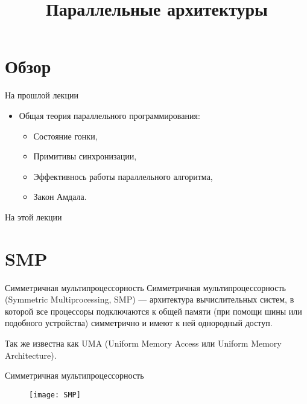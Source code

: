 

\title{Параллельные архитектуры}



\begin{frame}
\titlepage
\end{frame}

\section*{Обзор}

\begin{frame}{На прошлой лекции}

\begin{itemize}
    \item Общая теория параллельного программирования:
    \begin{itemize}
        \item Состояние гонки,
        \item Примитивы синхронизации,
        \item Эффективнось работы параллельного алгоритма,
        \item Закон Амдала.
    \end{itemize}
\end{itemize}

\end{frame}

\begin{frame}{На этой лекции}
\tableofcontents
\end{frame}

\section{SMP}

\begin{frame}{Симметричная мультипроцессорность}
Симметричная мультипроцессорность (\abbr Symmetric Multiprocessing, SMP) --- архитектура вычислительных систем, в которой все процессоры подключаются к общей памяти (при помощи шины или подобного устройства) симметрично и имеют к ней однородный доступ.

Так же известна как UMA (Uniform Memory Access или Uniform Memory Architecture).
\end{frame}

\begin{frame}{Симметричная мультипроцессорность}
\begin{figure}[htpb]
    \centering
    \texttt{[image: SMP]}
\end{figure}
\end{frame}

